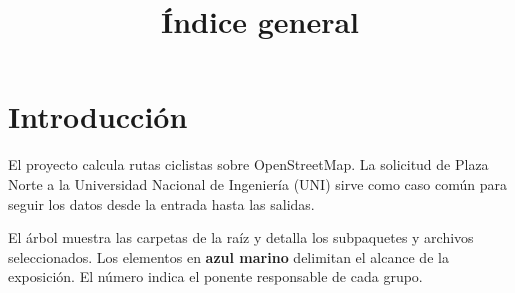 \documentclass[11pt,a4paper]{article}
\title{Índice general}
\author{}
\date{}
\begin{document}
\renewcommand{\labelenumii}{\theenumi.\arabic{enumii}}
\maketitle
\section*{Introducción}

El proyecto calcula rutas ciclistas sobre OpenStreetMap. La solicitud de Plaza Norte a la Universidad Nacional de Ingeniería (UNI) sirve como caso común para seguir los datos desde la entrada hasta las salidas.

El árbol muestra las carpetas de la raíz y detalla los subpaquetes y archivos seleccionados. Los elementos en \textbf{\textcolor{navyreport}{azul marino}} delimitan el alcance de la exposición. El número indica el ponente responsable de cada grupo.
\end{document}
